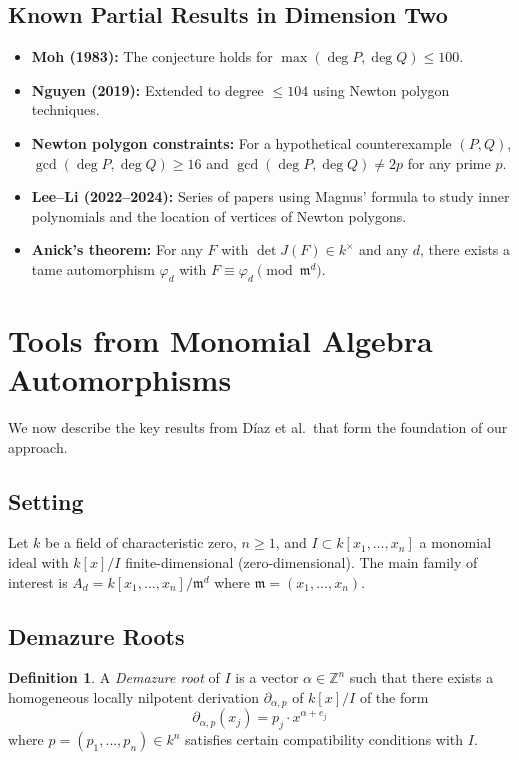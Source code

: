 \documentclass[12pt,a4paper]{article}
\theoremstyle{definition}
\newtheorem{definition}[theorem]{Definition}
\newcommand{\ZZ}{\mathbb{Z}}
\newcommand{\kk}{k}
\newcommand{\pp}{\mathfrak{m}}
\begin{document}
\subsection{Known Partial Results in Dimension Two}

\begin{itemize}
\item \textbf{Moh (1983):} The conjecture holds for $\max(\deg P, \deg Q) \leq 100$.
\item \textbf{Nguyen (2019):} Extended to degree $\leq 104$ using Newton polygon techniques.
\item \textbf{Newton polygon constraints:} For a hypothetical counterexample $(P,Q)$,
  $\gcd(\deg P, \deg Q) \geq 16$ and $\gcd(\deg P, \deg Q) \neq 2p$ for any prime $p$.
\item \textbf{Lee--Li (2022--2024):} Series of papers using Magnus' formula to study
  inner polynomials and the location of vertices of Newton polygons.
\item \textbf{Anick's theorem:} For any $F$ with $\det J(F) \in \kk^\times$ and any $d$,
  there exists a tame automorphism $\varphi_d$ with $F \equiv \varphi_d \pmod{\pp^d}$.
\end{itemize}

\section{Tools from Monomial Algebra Automorphisms}

We now describe the key results from D\'iaz et al.\ that form the foundation of our
approach.

\subsection{Setting}

Let $\kk$ be a field of characteristic zero, $n \geq 1$, and $I \subset \kk[x_1,\ldots,x_n]$
a monomial ideal with $\kk[x]/I$ finite-dimensional (zero-dimensional). The main family of
interest is $A_d = \kk[x_1,\ldots,x_n]/\pp^d$ where $\pp = (x_1,\ldots,x_n)$.

\subsection{Demazure Roots}

\begin{definition}
A \emph{Demazure root} of $I$ is a vector $\alpha \in \ZZ^n$ such that there exists a
homogeneous locally nilpotent derivation $\partial_{\alpha,p}$ of $\kk[x]/I$ of the form
\[
  \partial_{\alpha,p}(x_j) = p_j \cdot x^{\alpha + e_j}
\]
where $p = (p_1,\ldots,p_n) \in \kk^n$ satisfies certain compatibility conditions with $I$.
\end{definition}
\end{document}
